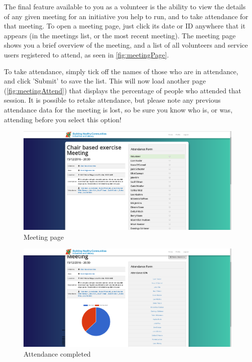 \documentclass{bhcguides}
\begin{document}
\pagebreak

The final feature available to you as a volunteer is the ability to view the details of any given meeting for an initiative you help to run, and to take attendance for that meeting. To open a meeting page, just click its date or ID anywhere that it appears (in the meetings list, or the most recent meeting). The meeting page shows you a brief overview of the meeting, and a list of all volunteers and service users registered to attend, as seen in \autoref{fig:meetingPage}.

To take attendance, simply tick off the names of those who are in attendance, and click 'Submit' to save the list. This will now load another page (\autoref{fig:meetingAttend}) that displays the percentage of people who attended that session. It is possible to retake attendance, but please note any previous attendance data for the meeting is lost, so be sure you know who is, or was, attending before you select this option!

\begin{figure}[h]
 \centerline{\includegraphics[width=\textwidth, height=\textheight, keepaspectratio]{meetingpage.png}}
 \caption{Meeting page}
 \label{fig:meetingPage}
\end{figure}

\begin{figure}[h]
 \centerline{\includegraphics[width=\textwidth, height=\textheight, keepaspectratio]{meetingattendance.png}}
 \caption{Attendance completed}
 \label{fig:meetingAttend}
\end{figure}
\end{document}
